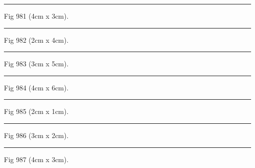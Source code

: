 \documentclass[a4paper,11pt]{article}
\begin{document}
\begin{swarmwrap}%
  \begin{minipage}[t]{4cm}
    \centering
    \rule{\linewidth}{3cm}
    {\footnotesize Fig 981 (4cm x 3cm).}
  \end{minipage}%
\end{swarmwrap}%
\swarmwrapnext
\lipsum[81]%

\begin{swarmwrap}%
  \begin{minipage}[t]{2cm}
    \centering
    \rule{\linewidth}{4cm}
    {\footnotesize Fig 982 (2cm x 4cm).}
  \end{minipage}%
\end{swarmwrap}%
\swarmwrapnext
\lipsum[82]%

\begin{swarmwrap}%
  \begin{minipage}[t]{3cm}
    \centering
    \rule{\linewidth}{5cm}
    {\footnotesize Fig 983 (3cm x 5cm).}
  \end{minipage}%
\end{swarmwrap}%
\swarmwrapnext
\lipsum[83]%

\begin{swarmwrap}%
  \begin{minipage}[t]{4cm}
    \centering
    \rule{\linewidth}{6cm}
    {\footnotesize Fig 984 (4cm x 6cm).}
  \end{minipage}%
\end{swarmwrap}%
\swarmwrapnext
\lipsum[84]%

\begin{swarmwrap}%
  \begin{minipage}[t]{2cm}
    \centering
    \rule{\linewidth}{1cm}
    {\footnotesize Fig 985 (2cm x 1cm).}
  \end{minipage}%
\end{swarmwrap}%
\swarmwrapnext
\lipsum[85]%

\begin{swarmwrap}%
  \begin{minipage}[t]{3cm}
    \centering
    \rule{\linewidth}{2cm}
    {\footnotesize Fig 986 (3cm x 2cm).}
  \end{minipage}%
\end{swarmwrap}%
\swarmwrapnext
\lipsum[86]%

\begin{swarmwrap}%
  \begin{minipage}[t]{4cm}
    \centering
    \rule{\linewidth}{3cm}
    {\footnotesize Fig 987 (4cm x 3cm).}
  \end{minipage}%
\end{swarmwrap}%
\swarmwrapnext
\lipsum[87]%
\end{document}

